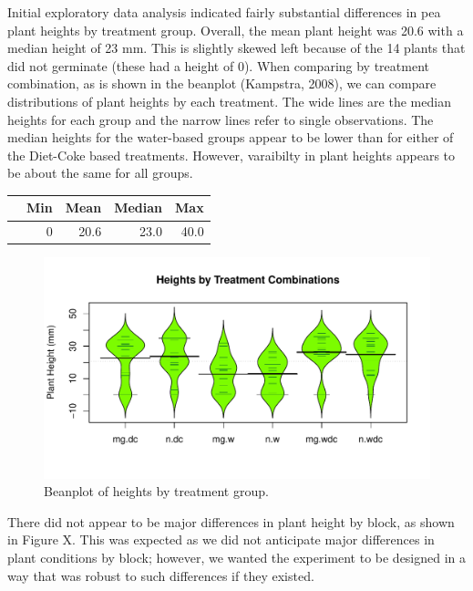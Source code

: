 \documentclass[1p,12pt]{elsarticle}\usepackage[]{graphicx}\usepackage[]{color}
\makeatletter
\def\maxwidth{ %
  \ifdim\Gin@nat@width>\linewidth
    \linewidth
  \else
    \Gin@nat@width
  \fi
}
\newenvironment{knitrout}{}{} %
\makeatother
\begin{document}
Initial exploratory data analysis indicated fairly substantial differences in pea plant heights by treatment group. Overall, the mean plant height was 20.6 with a median height of 23 mm. This is slightly skewed left because of the 14 plants that did not germinate (these had a height of 0). When comparing by treatment combination, as is shown in the beanplot (Kampstra, 2008), we can compare distributions of plant heights by each treatment. The wide lines are the median heights for each group and the narrow lines refer to single observations. The median heights for the water-based groups appear to be lower than for either of the Diet-Coke based treatments. However, varaibilty in plant heights appears to be about the same for all groups. 

\begin{table}[ht]
\centering
\begin{tabular}{rrrrr}
  \hline
 & Min & Mean & Median & Max \\ 
  \hline
 & 0 & 20.6 & 23.0 & 40.0 \\ 
  
   \hline
\end{tabular}
\end{table}

\begin{knitrout}
\color{fgcolor}\begin{figure}
\includegraphics[width=\maxwidth]{figure/eda-1} \caption[Beanplot of heights by treatment group]{Beanplot of heights by treatment group.}\label{fig:eda}
\end{figure}


\end{knitrout}

There did not appear to be major differences in plant height by block, as shown in Figure X. This was expected as we did not anticipate major differences in plant conditions by block; however, we wanted the experiment to be designed in a way that was robust to such differences if they existed. 
\end{document}

